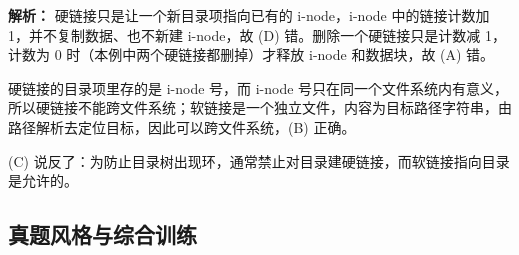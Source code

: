 \begin{enumerate}
\ifshowsolutions\par\noindent\textbf{解析：} 硬链接只是让一个新目录项指向已有的 i-node，i-node 中的链接计数加 1，并不复制数据、也不新建 i-node，故 (D) 错。删除一个硬链接只是计数减 1，计数为 0 时（本例中两个硬链接都删掉）才释放 i-node 和数据块，故 (A) 错。

硬链接的目录项里存的是 i-node 号，而 i-node 号只在同一个文件系统内有意义，所以硬链接不能跨文件系统；软链接是一个独立文件，内容为目标路径字符串，由路径解析去定位目标，因此可以跨文件系统，(B) 正确。

(C) 说反了：为防止目录树出现环，通常禁止对目录建硬链接，而软链接指向目录是允许的。\else \answerarea \fi

\end{enumerate}

\subsection{真题风格与综合训练}

